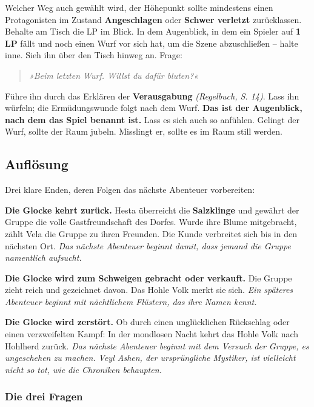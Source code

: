 \documentclass[10pt,a4paper]{article}
\begin{document}
Welcher Weg auch gewählt wird, der Höhepunkt sollte mindestens einen Protagonisten im Zustand \textbf{Angeschlagen} oder \textbf{Schwer verletzt} zurücklassen. Behalte am Tisch die LP im Blick. In dem Augenblick, in dem ein Spieler auf \textbf{1 LP} fällt und noch einen Wurf vor sich hat, um die Szene abzuschließen -- halte inne. Sieh ihn über den Tisch hinweg an. Frage:

\begin{quote}
\emph{»Beim letzten Wurf. Willst du dafür bluten?«}
\end{quote}

Führe ihn durch das Erklären der \textbf{Verausgabung} \emph{(Regelbuch, S. 14)}. Lass ihn würfeln; die Ermüdungswunde folgt nach dem Wurf. \textbf{Das ist der Augenblick, nach dem das Spiel benannt ist.} Lass es sich auch so anfühlen. Gelingt der Wurf, sollte der Raum jubeln. Misslingt er, sollte es im Raum still werden.

\par\vspace{3pt}

\subsection{Auflösung}\label{aufluxf6sung}

Drei klare Enden, deren Folgen das nächste Abenteuer vorbereiten:

\textbf{Die Glocke kehrt zurück.} Hesta überreicht die \textbf{Salzklinge} und gewährt der Gruppe die volle Gastfreundschaft des Dorfes. Wurde ihre Blume mitgebracht, zählt Vela die Gruppe zu ihren Freunden. Die Kunde verbreitet sich bis in den nächsten Ort. \emph{Das nächste Abenteuer beginnt damit, dass jemand die Gruppe namentlich aufsucht.}

\textbf{Die Glocke wird zum Schweigen gebracht oder verkauft.} Die Gruppe zieht reich und gezeichnet davon. Das Hohle Volk merkt sie sich. \emph{Ein späteres Abenteuer beginnt mit nächtlichem Flüstern, das ihre Namen kennt.}

\textbf{Die Glocke wird zerstört.} Ob durch einen unglücklichen Rückschlag oder einen verzweifelten Kampf: In der mondlosen Nacht kehrt das Hohle Volk nach Hohlherd zurück. \emph{Das nächste Abenteuer beginnt mit dem Versuch der Gruppe, es ungeschehen zu machen. Veyl Ashen, der ursprüngliche Mystiker, ist vielleicht nicht so tot, wie die Chroniken behaupten.}

\subsubsection{Die drei Fragen}\label{die-drei-fragen}
\end{document}
